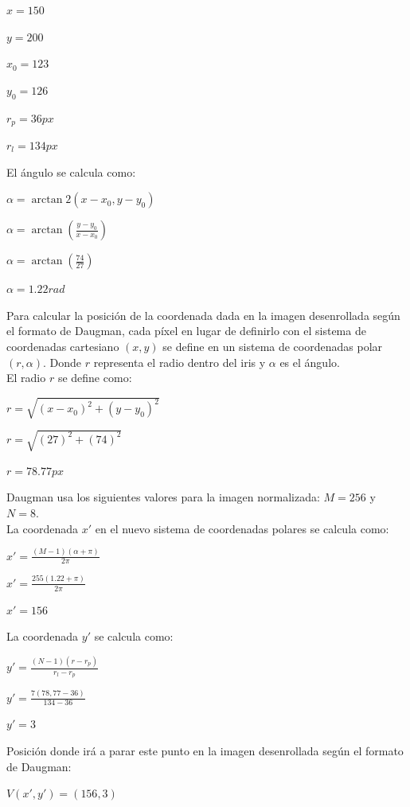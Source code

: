 \documentclass[10pt,a4paper]{article}
\begin{document}
\begin{enumerate}[label=\textbf{\alph*)}]
\begin{center}
$x = 150$

$y = 200$

$x_{0} = 123$

$y_{0} = 126$

$r_{p} = 36px$

$r_{l} = 134px$
\end{center}


El ángulo se calcula como:
\begin{center}
$\alpha = \arctan2(x - x_{0}, y - y_{0})$

$\alpha = \arctan(\frac{y - y_{0}}{x - x_{0}})$

$\alpha = \arctan(\frac{74}{27})$

$\alpha = 1.22 rad$
\end{center}

Para calcular la posición de la coordenada dada en la imagen desenrollada según el formato de Daugman, cada píxel en lugar de definirlo con el sistema de coordenadas cartesiano $(x, y)$ se define en un sistema de coordenadas polar $(r, \alpha)$. Donde $r$ representa el radio dentro del iris y $\alpha$ es el ángulo.\\

El radio $r$ se define como:
\begin{center}
$r = \sqrt{(x - x_{0})^2 + (y - y_{0})^2}$

$r = \sqrt{(27)^2 + (74)^2}$

$r = 78.77px$
\end{center}
Daugman usa los siguientes valores para la imagen normalizada: $M = 256$ y $N = 8$.\\
La coordenada $x'$ en el nuevo sistema de coordenadas polares se calcula como:
\begin{center}
$ x' = \frac{(M-1)(\alpha + \pi)}{2\pi}$

$ x' = \frac{255(1.22 + \pi)}{2\pi}$

$ x' = 156$
\end{center}

La coordenada $y'$ se calcula como:
\begin{center}
$ y' = \frac{(N-1)(r - r_{p})}{r_{l} - r_{p}}$

$ y' = \frac{7(78,77 - 36)}{134 - 36}$

$ y' = 3$
\end{center}
Posición donde irá a parar este punto en la imagen desenrollada según el formato de Daugman:
\begin{center}
$ V(x', y') = (156, 3)$
\end{center}
\end{enumerate}
\end{document}
